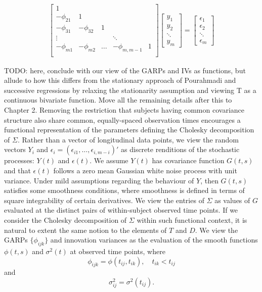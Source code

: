 \documentclass[12pt]{article}
\theoremstyle{definition}
\begin{document}
{{{{\begin{align}
\begin{bmatrix}
1&&&&\\
-\phi_{21}&1&&&\\
-\phi_{31}&-\phi_{32}&1&&\\
\vdots &&&\ddots& \\
-\phi_{m1}&-\phi_{m2}& \dots & -\phi_{m,m-1}&1\\
\end{bmatrix}
\begin{bmatrix}
y_1 \\
y_2 \\ \ddots \\ y_m
\end{bmatrix} = \begin{bmatrix}
\epsilon_1 \\
\epsilon_2 \\ \ddots \\ \epsilon_m
\end{bmatrix}
\end{align}

\bigskip
TODO: here, conclude with our view of the GARPs and IVs as functions, but allude to how this differs from the stationary approach of Pourahmadi and successive regressions by relaxing the stationarity assumption and viewing T as a continuous bivariate function. Move all the remaining details after this to Chapter 2.
\bigskip
Removing the restriction that subjects having common covariance structure also share common, equally-spaced observation times encourages a functional representation of the parameters defining the Cholesky decomposition of $\Sigma$. Rather than a vector of longitudinal data points, we view the random vectors $Y_i$ and $\epsilon_i = \left(\epsilon_{i1}, \dots, \epsilon_{i, m-i} \right)'$ as discrete renditions of the stochastic processes: $Y\left(t\right)$ and $\epsilon\left(t\right)$. We assume $Y\left(t\right)$ has covariance function $G\left(t,s\right)$ and that $\epsilon\left(t\right)$ follows a zero mean Gaussian white noise process with unit variance. Under mild assumptions regarding the behaviour of $Y$, then $G\left(t,s\right)$ satisfies some smoothness conditions, where smoothness is defined in terms of square integrability of certain derivatives. We view the entries of $\Sigma$ as values of $G$ evaluated at the distinct pairs of within-subject observed time points. 
\bigskip
If we consider the Cholesky decomposition of $\Sigma$ within such functional context, it is natural to extent the same notion to the elements of $T$ and $D$. We view the GARPs $\lbrace \phi_{ijk} \rbrace$ and innovation variances as the evaluation of the smooth functions $\phi\left(t,s\right)$ and $\sigma^2\left(t\right)$ at observed time points, where 
\[
\phi_{ijk} = \phi\left(t_{ij},t_{ik}\right), \quad t_{ik} < t_{ij}
\]
and
\[
\sigma_{ij}^2 = \sigma^2\left(t_{ij}\right).
\]

}}}}
\end{document}
